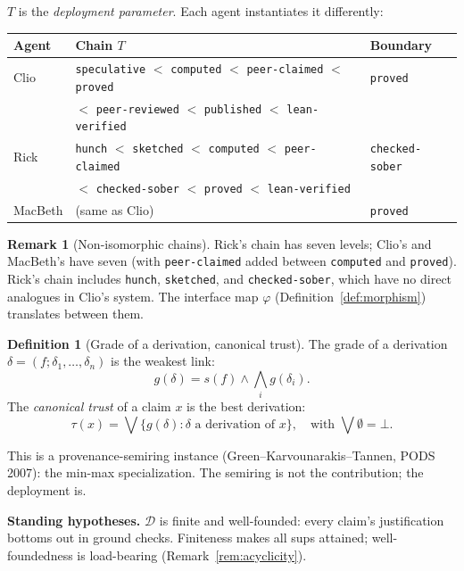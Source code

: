 \documentclass[11pt,a4paper]{article}
\newcommand{\level}[1]{\texttt{#1}}
\theoremstyle{plain}
\theoremstyle{definition}
\newtheorem{definition}[theorem]{Definition}
\newtheorem{remark}[theorem]{Remark}
\begin{document}
$T$ is the \emph{deployment parameter}. Each agent instantiates it
differently:

\begin{center}
\begin{tabular}{lll}
\toprule
Agent & Chain $T$ & Boundary \\
\midrule
Clio & \level{speculative} $<$ \level{computed} $<$ \level{peer-claimed} $<$ \level{proved} & \level{proved} \\
& \quad $<$ \level{peer-reviewed} $<$ \level{published} $<$ \level{lean-verified} & \\
Rick & \level{hunch} $<$ \level{sketched} $<$ \level{computed} $<$ \level{peer-claimed} & \level{checked-sober} \\
& \quad $<$ \level{checked-sober} $<$ \level{proved} $<$ \level{lean-verified} & \\
MacBeth & (same as Clio) & \level{proved} \\
\bottomrule
\end{tabular}
\end{center}

\begin{remark}[Non-isomorphic chains]
Rick's chain has seven levels; Clio's and MacBeth's have seven (with
\level{peer-claimed} added between \level{computed} and \level{proved}).
Rick's chain includes \level{hunch}, \level{sketched}, and
\level{checked-sober}, which have no direct analogues in Clio's system.
The interface map $\varphi$ (Definition~\ref{def:morphism}) translates
between them.
\end{remark}

\begin{definition}[Grade of a derivation, canonical trust]
\label{def:canonical-trust}
The grade of a derivation $\delta = (f; \delta_1, \ldots, \delta_n)$ is
the weakest link:
\[
g(\delta) = s(f) \wedge \bigwedge_i g(\delta_i).
\]
The \emph{canonical trust} of a claim $x$ is the best derivation:
\[
\tau(x) = \bigvee \{ g(\delta) : \delta \text{ a derivation of } x \},
\quad \text{with } \bigvee \emptyset = \bot.
\]
\end{definition}

This is a provenance-semiring instance (Green--Karvounarakis--Tannen,
PODS 2007): the min-max specialization. The semiring is not the
contribution; the deployment is.

\textbf{Standing hypotheses.} ${\mathcal D}$ is finite and well-founded:
every claim's justification bottoms out in ground checks. Finiteness
makes all sups attained; well-foundedness is load-bearing
(Remark~\ref{rem:acyclicity}).
\end{document}
